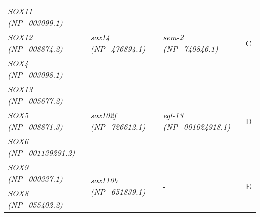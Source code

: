 \documentclass[../main.tex]{subfiles}
\begin{document}
\begin{longtable}{llll}
	\textit{SOX11 (NP\_003099.1)}                           & \multirow{3}{*}{\textit{sox14 (NP\_476894.1)}}                                                         & \multirow{3}{*}{\textit{sem-2 (NP\_740846.1)}}                                                     & \multirow{3}{*}{C}    \\
	\textit{SOX12 (NP\_008874.2)}                           &                                                                                                        &                                                                                                    &                       \\
	\textit{SOX4 (NP\_003098.1)}                            &                                                                                                        &                                                                                                    &                       \\ [0.2cm]
	\textit{SOX13 (NP\_005677.2)}                           & \multirow{3}{*}{\textit{sox102f (NP\_726612.1)}}                                                       & \multirow{3}{*}{\textit{egl-13 (NP\_001024918.1)}}                                                 & \multirow{3}{*}{D}    \\
	\textit{SOX5 (NP\_008871.3)}                            &                                                                                                        &                                                                                                    &                       \\
	\textit{SOX6 (NP\_001139291.2)}                         &                                                                                                        &                                                                                                    &                       \\ [0.2cm]
	\textit{SOX9 (NP\_000337.1)}                            & \multirow{3}{*}{\textit{sox110b (NP\_651839.1)}}                                                       & \multirow{3}{*}{-}                                                                                 & \multirow{3}{*}{E}    \\
	\textit{SOX8 (NP\_055402.2)}                            &                                                                                                        &                                                                                                    &                       \\

\end{longtable}
\end{document}
